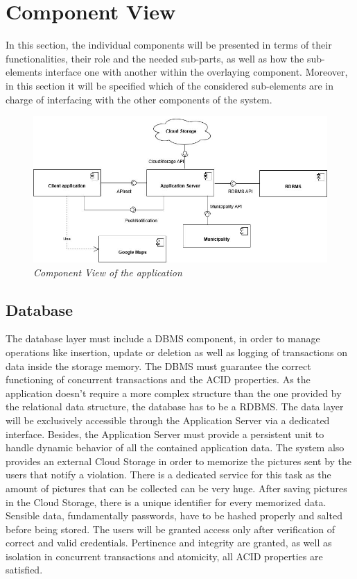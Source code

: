 \section{Component View}
In this section, the individual components will be presented in terms of their functionalities, their role and the 
needed sub-parts, as well as how the sub-elements interface one with another within the overlaying component. Moreover, 
in this section it will be specified which of the considered sub-elements are in charge of interfacing with the other 
components of the system.

\begin{figure}[H]
  \centering
  \includegraphics[width=\textwidth]{DD_Images/ComponentView/componentView.jpg}
  \caption{\textit{Component View of the application}}
\end{figure}

\subsection{Database}
The database layer must include a DBMS component, in order to manage operations like insertion, update or deletion as 
well as logging of transactions on data inside the storage memory. The DBMS must guarantee the correct functioning of 
concurrent transactions and the ACID properties. As the application doesn’t require a more complex structure than the 
one provided by the relational data structure, the database has to be a RDBMS. The data layer will be exclusively 
accessible through the Application Server via a dedicated interface. Besides, the Application Server must provide a 
persistent unit to handle dynamic behavior of all the contained application data. 
\newline The system also provides an external Cloud Storage in order to memorize the pictures sent by the users that 
notify a violation. There is a dedicated service for this task as the amount of pictures that can be collected can be 
very huge. After saving pictures in the Cloud Storage, there is a unique identifier for every memorized data.
\newline Sensible data, fundamentally passwords, have to be hashed properly and salted before being stored. 
The users will be granted access only after verification of correct and valid credentials.
\newline Pertinence and integrity are granted, as well as isolation in concurrent transactions and atomicity, all ACID properties 
are satisfied.

